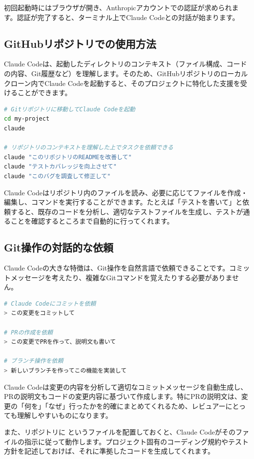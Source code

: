 初回起動時にはブラウザが開き、Anthropicアカウントでの認証が求められます。認証が完了すると、ターミナル上でClaude Codeとの対話が始まります。

\subsection{GitHubリポジトリでの使用方法}

Claude Codeは、起動したディレクトリのコンテキスト（ファイル構成、コードの内容、Git履歴など）を理解します。そのため、GitHubリポジトリのローカルクローン内でClaude Codeを起動すると、そのプロジェクトに特化した支援を受けることができます。

\begin{lstlisting}[language=bash]
# Gitリポジトリに移動してClaude Codeを起動
cd my-project
claude

# リポジトリのコンテキストを理解した上でタスクを依頼できる
claude "このリポジトリのREADMEを改善して"
claude "テストカバレッジを向上させて"
claude "このバグを調査して修正して"
\end{lstlisting}

Claude Codeはリポジトリ内のファイルを読み、必要に応じてファイルを作成・編集し、コマンドを実行することができます。たとえば「テストを書いて」と依頼すると、既存のコードを分析し、適切なテストファイルを生成し、テストが通ることを確認するところまで自動的に行ってくれます。

\subsection{Git操作の対話的な依頼}

Claude Codeの大きな特徴は、Git操作を自然言語で依頼できることです。コミットメッセージを考えたり、複雑なGitコマンドを覚えたりする必要がありません。

\begin{lstlisting}[language=bash]
# Claude Codeにコミットを依頼
> この変更をコミットして

# PRの作成を依頼
> この変更でPRを作って、説明文も書いて

# ブランチ操作を依頼
> 新しいブランチを作ってこの機能を実装して
\end{lstlisting}

Claude Codeは変更の内容を分析して適切なコミットメッセージを自動生成し、PRの説明文もコードの変更内容に基づいて作成します。特にPRの説明文は、変更の「何を」「なぜ」行ったかを的確にまとめてくれるため、レビュアーにとっても理解しやすいものになります。

また、リポジトリに  というファイルを配置しておくと、Claude Codeがそのファイルの指示に従って動作します。プロジェクト固有のコーディング規約やテスト方針を記述しておけば、それに準拠したコードを生成してくれます。

